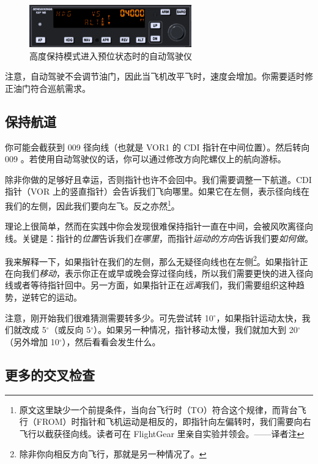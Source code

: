 \begin{figure}
  \begin{center}
    \includegraphics[width=7cm]{img/ap_alt}
    \caption{高度保持模式进入预位状态时的自动驾驶仪}
    \label{fig:ap_alt}
  \end{center}
\end{figure}

注意，自动驾驶不会调节油门，因此当飞机改平飞时，速度会增加。你需要适时修正油门符合巡航需求。

\subsection{保持航道}

你可能会截获到 009 径向线（也就是 VOR1 的 CDI 指针在中间位置）。然后转向 009 。若使用自动驾驶仪的话，你可以通过修改方向陀螺仪上的航向游标。

除非你做的足够好且幸运，否则指针也许不会回中。我们需要调整一下航道。CDI 指针（VOR 上的竖直指针）会告诉我们飞向哪里。如果它在左侧，表示径向线在我们的左侧，因此我们要向左飞。反之亦然\footnote{原文这里缺少一个前提条件，当向台飞行时（TO）符合这个规律，而背台飞行（FROM）时指针和飞机运动是相反的，即指针向左偏转时，我们需要向右飞行以截获径向线。读者可在 FlightGear 里亲自实验并领会。——译者注}。

理论上很简单，然而在实践中你会发现很难保持指针一直在中间，会被风吹离径向线。关键是：指针的\emph{位置}告诉我们\emph{在哪里}，而指针\emph{运动的方向}告诉我们要\emph{如何做}。

我来解释一下，如果指针在我们的左侧，那么无疑径向线也在左侧\footnote{除非你向相反方向飞行，那就是另一种情况了。}。如果指针正在向我们\emph{移动}，表示你正在或早或晚会穿过径向线，所以我们需要更快的进入径向线或者等待指针回中。另一方面，如果指针正在\emph{远离}我们，我们需要组织这种趋势，逆转它的运动。

注意，刚开始我们很难猜测需要转多少。可先尝试转 10$^\circ$，如果指针运动太快，我们就改成 5$^\circ$（或反向 5$^\circ$）。如果另一种情况，指针移动太慢，我们就加大到 20$^\circ$（另外增加 10$^\circ$），然后看看会发生什么。

\subsection{更多的交叉检查}

